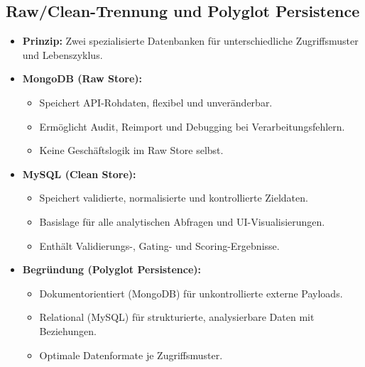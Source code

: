 \subsection{Raw/Clean-Trennung und Polyglot Persistence}
\begin{itemize}
  \item \textbf{Prinzip:} Zwei spezialisierte Datenbanken für unterschiedliche Zugriffsmuster und Lebenszyklus. %
  \item \textbf{MongoDB (Raw Store):}
    \begin{itemize}
      \item Speichert API-Rohdaten, flexibel und unveränderbar.
      \item Ermöglicht Audit, Reimport und Debugging bei Verarbeitungsfehlern.
      \item Keine Geschäftslogik im Raw Store selbst.
    \end{itemize}
  \item \textbf{MySQL (Clean Store):}
    \begin{itemize}
      \item Speichert validierte, normalisierte und kontrollierte Zieldaten.
      \item Basislage für alle analytischen Abfragen und UI-Visualisierungen.
      \item Enthält Validierungs-, Gating- und Scoring-Ergebnisse.
    \end{itemize}
  \item \textbf{Begründung (Polyglot Persistence):} %
    \begin{itemize}
      \item Dokumentorientiert (MongoDB) für unkontrollierte externe Payloads.
      \item Relational (MySQL) für strukturierte, analysierbare Daten mit Beziehungen.
      \item Optimale Datenformate je Zugriffsmuster.
    \end{itemize}
\end{itemize}

